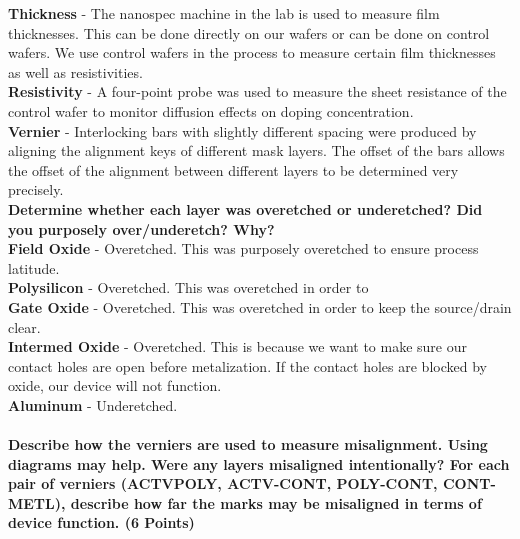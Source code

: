 \documentclass{article}
\begin{document}
\textbf{Thickness} -
The nanospec machine in the lab is used to measure film thicknesses. This can be done directly on our wafers or can be done on control wafers. We use control wafers in the process to measure certain film thicknesses as well as resistivities. \\

\textbf{Resistivity} - 
A four-point probe was used to measure the sheet resistance of the control wafer to monitor diffusion effects on doping concentration. \\

\textbf{Vernier} - 
Interlocking bars with slightly different spacing were produced by aligning the alignment keys of different mask layers. The offset of the bars allows the offset of the alignment between different layers to be determined very precisely. \\

\textbf{Determine whether each layer was overetched or underetched? Did you purposely
over/underetch? Why?} \\

\textbf{Field Oxide} - Overetched. This was purposely overetched to ensure process latitude. \\
\textbf{Polysilicon} - Overetched. This was overetched in order to \\
\textbf{Gate Oxide} - Overetched. This was overetched in order to keep the source/drain clear. \\
\textbf{Intermed Oxide} - Overetched. This is because we want to make sure our contact holes are open before metalization. If the contact holes are blocked by oxide, our device will not function. \\
\textbf{Aluminum} - Underetched. \\ \\ 
\textbf{Describe how the verniers are used to measure misalignment. Using diagrams may
help. Were any layers misaligned intentionally? For each pair of verniers (ACTVPOLY,
ACTV-CONT, POLY-CONT, CONT-METL), describe how far the marks
may be misaligned in terms of device function. (6 Points)} \\

\subsection{}
\subsection{}
\end{document}
